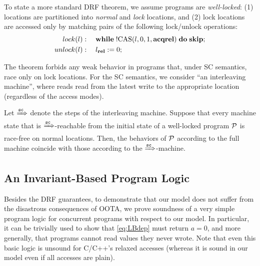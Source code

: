 To state a more standard DRF theorem, 
we assume programs are \emph{well-locked}:
(1) locations are partitioned into \emph{normal} and \emph{lock} locations, and
(2) lock locations are accessed only by matching pairs of the following lock/unlock operations:
\begin{align*}
lock(l) & : \quad \textbf{while}\;!\textrm{CAS}({l},{0},{1},{\textbf{acq}\textbf{rel}})\;\textbf{do}\;\textbf{skip}; \\
unlock(l) & : \quad l_{\textbf{rel}} := 0; 
\end{align*}

The theorem forbids any weak behavior in programs that, under SC semantics, race only on lock locations.
For the SC semantics, we consider ``an interleaving machine'', 
where reads read from the latest write to the appropriate location
(regardless of the access modes).

\begin{theorem}
\label{thm:drflock}
Let $\xRightarrow{{\texttt{sc}}}$ denote the steps of the interleaving machine.
Suppose that every machine state that is $\xRightarrow{{\texttt{sc}}}$-reachable from
the initial state of a well-locked program $\mathcal{P}$ is race-free on normal locations.
Then, the behaviors of $\mathcal{P}$ according to the full machine coincide with those
according to the $\xRightarrow{{\texttt{sc}}}$-machine.
\end{theorem}




\subsection{An Invariant-Based Program Logic}
\label{sec:invariant}
Besides the DRF guarantees, to demonstrate that our model does not suffer from
the disastrous consequences of OOTA, 
we prove soundness of a very simple program logic for concurrent programs with respect to our model.
In particular, it can be trivially used to show that \ref{eq:LBdep} must return $a=0$,
and more generally, that programs cannot read values they never wrote.
Note that even this basic logic is unsound for C/C++'s relaxed accesses
(whereas it is sound in our model even if all accesses are plain).

